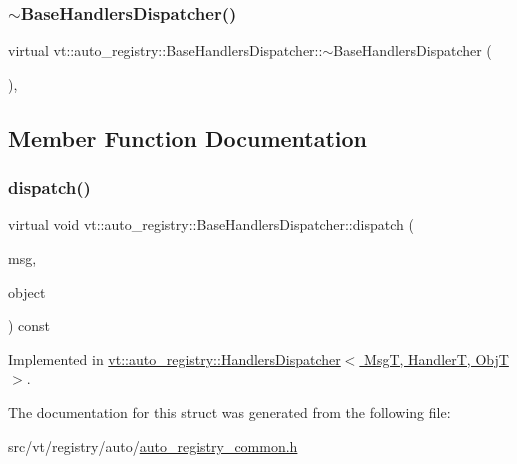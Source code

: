 \subsubsection{\texorpdfstring{$\sim$\+Base\+Handlers\+Dispatcher()}{~BaseHandlersDispatcher()}}
{\footnotesize\ttfamily virtual vt\+::auto\+\_\+registry\+::\+Base\+Handlers\+Dispatcher\+::$\sim$\+Base\+Handlers\+Dispatcher (\begin{DoxyParamCaption}{ }\end{DoxyParamCaption})\hspace{0.3cm}{\ttfamily [virtual]}, {\ttfamily [default]}}



\subsection{Member Function Documentation}
\mbox{\label{structvt_1_1auto__registry_1_1_base_handlers_dispatcher_aefc05db879ce57b3ea0295afa56aa819}} 
\subsubsection{\texorpdfstring{dispatch()}{dispatch()}}
{\footnotesize\ttfamily virtual void vt\+::auto\+\_\+registry\+::\+Base\+Handlers\+Dispatcher\+::dispatch (\begin{DoxyParamCaption}\item[{\hyperlink{structvt_1_1messaging_1_1_base_msg}{messaging\+::\+Base\+Msg} $\ast$}]{msg,  }\item[{void $\ast$}]{object }\end{DoxyParamCaption}) const\hspace{0.3cm}{\ttfamily [pure virtual]}}



Implemented in \hyperlink{structvt_1_1auto__registry_1_1_handlers_dispatcher_a0b335de6d03c14798e01a760f68a0719}{vt\+::auto\+\_\+registry\+::\+Handlers\+Dispatcher$<$ Msg\+T, Handler\+T, Obj\+T $>$}.



The documentation for this struct was generated from the following file\+:\begin{DoxyCompactItemize}
\item 
src/vt/registry/auto/\hyperlink{auto__registry__common_8h}{auto\+\_\+registry\+\_\+common.\+h}\end{DoxyCompactItemize}
